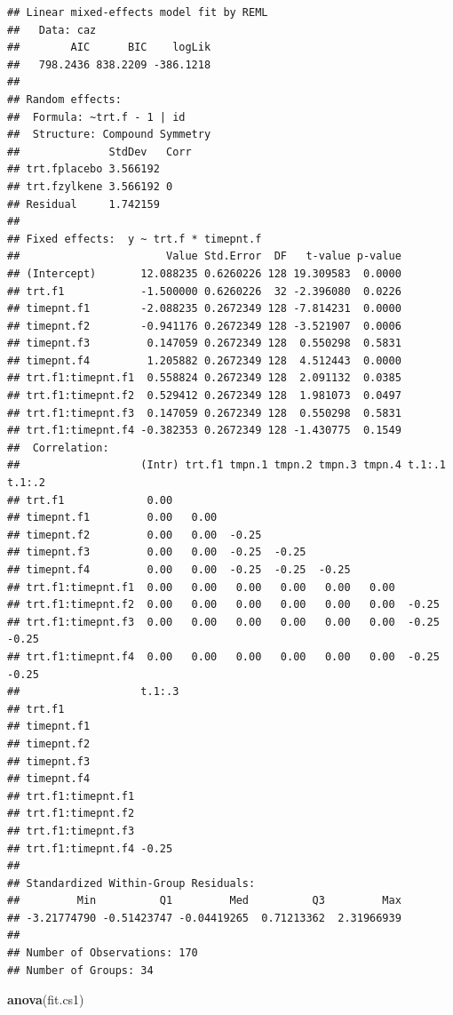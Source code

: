 \documentclass[
]{book}
\newenvironment{Shaded}{\begin{snugshade}}{\end{snugshade}}
\newcommand{\FunctionTok}[1]{\textcolor[rgb]{0.13,0.29,0.53}{\textbf{#1}}}
\newcommand{\NormalTok}[1]{#1}
\begin{document}
\begin{verbatim}
## Linear mixed-effects model fit by REML
##   Data: caz 
##        AIC      BIC    logLik
##   798.2436 838.2209 -386.1218
## 
## Random effects:
##  Formula: ~trt.f - 1 | id
##  Structure: Compound Symmetry
##              StdDev   Corr
## trt.fplacebo 3.566192     
## trt.fzylkene 3.566192 0   
## Residual     1.742159     
## 
## Fixed effects:  y ~ trt.f * timepnt.f 
##                       Value Std.Error  DF   t-value p-value
## (Intercept)       12.088235 0.6260226 128 19.309583  0.0000
## trt.f1            -1.500000 0.6260226  32 -2.396080  0.0226
## timepnt.f1        -2.088235 0.2672349 128 -7.814231  0.0000
## timepnt.f2        -0.941176 0.2672349 128 -3.521907  0.0006
## timepnt.f3         0.147059 0.2672349 128  0.550298  0.5831
## timepnt.f4         1.205882 0.2672349 128  4.512443  0.0000
## trt.f1:timepnt.f1  0.558824 0.2672349 128  2.091132  0.0385
## trt.f1:timepnt.f2  0.529412 0.2672349 128  1.981073  0.0497
## trt.f1:timepnt.f3  0.147059 0.2672349 128  0.550298  0.5831
## trt.f1:timepnt.f4 -0.382353 0.2672349 128 -1.430775  0.1549
##  Correlation: 
##                   (Intr) trt.f1 tmpn.1 tmpn.2 tmpn.3 tmpn.4 t.1:.1 t.1:.2
## trt.f1             0.00                                                  
## timepnt.f1         0.00   0.00                                           
## timepnt.f2         0.00   0.00  -0.25                                    
## timepnt.f3         0.00   0.00  -0.25  -0.25                             
## timepnt.f4         0.00   0.00  -0.25  -0.25  -0.25                      
## trt.f1:timepnt.f1  0.00   0.00   0.00   0.00   0.00   0.00               
## trt.f1:timepnt.f2  0.00   0.00   0.00   0.00   0.00   0.00  -0.25        
## trt.f1:timepnt.f3  0.00   0.00   0.00   0.00   0.00   0.00  -0.25  -0.25 
## trt.f1:timepnt.f4  0.00   0.00   0.00   0.00   0.00   0.00  -0.25  -0.25 
##                   t.1:.3
## trt.f1                  
## timepnt.f1              
## timepnt.f2              
## timepnt.f3              
## timepnt.f4              
## trt.f1:timepnt.f1       
## trt.f1:timepnt.f2       
## trt.f1:timepnt.f3       
## trt.f1:timepnt.f4 -0.25 
## 
## Standardized Within-Group Residuals:
##         Min          Q1         Med          Q3         Max 
## -3.21774790 -0.51423747 -0.04419265  0.71213362  2.31966939 
## 
## Number of Observations: 170
## Number of Groups: 34
\end{verbatim}

\begin{Shaded}
\begin{Highlighting}[]
\FunctionTok{anova}\NormalTok{(fit.cs1)}
\end{Highlighting}
\end{Shaded}
\end{document}
